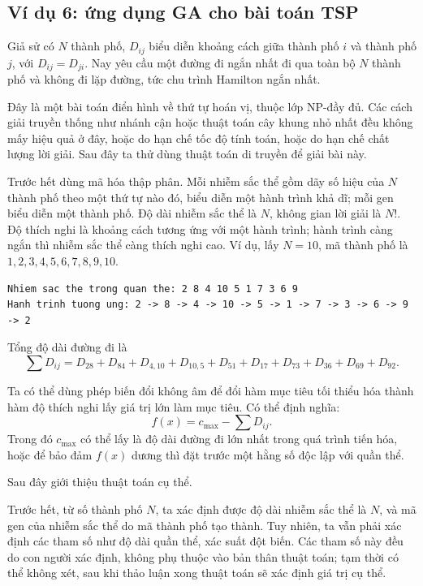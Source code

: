 \documentclass[11pt]{article}
\begin{document}
\subsection{Ví dụ 6: ứng dụng GA cho bài toán TSP}

Giả sử có \(N\) thành phố, \(D_{ij}\) biểu diễn khoảng cách giữa thành phố
\(i\) và thành phố \(j\), với \(D_{ij}=D_{ji}\). Nay yêu cầu một đường đi
ngắn nhất đi qua toàn bộ \(N\) thành phố và không đi lặp đường, tức chu trình
Hamilton ngắn nhất.

Đây là một bài toán điển hình về thứ tự hoán vị, thuộc lớp NP-đầy đủ. Các
cách giải truyền thống như nhánh cận hoặc thuật toán cây khung nhỏ nhất đều
không mấy hiệu quả ở đây, hoặc do hạn chế tốc độ tính toán, hoặc do hạn chế
chất lượng lời giải. Sau đây ta thử dùng thuật toán di truyền để giải bài
này.

Trước hết dùng mã hóa thập phân. Mỗi nhiễm sắc thể gồm dãy số hiệu của \(N\)
thành phố theo một thứ tự nào đó, biểu diễn một hành trình khả dĩ; mỗi gen
biểu diễn một thành phố. Độ dài nhiễm sắc thể là \(N\), không gian lời giải
là \(N!\). Độ thích nghi là khoảng cách tương ứng với một hành trình; hành
trình càng ngắn thì nhiễm sắc thể càng thích nghi cao. Ví dụ, lấy \(N=10\),
mã thành phố là \(1,2,3,4,5,6,7,8,9,10\).
\begin{verbatim}
Nhiem sac the trong quan the: 2 8 4 10 5 1 7 3 6 9
Hanh trinh tuong ung: 2 -> 8 -> 4 -> 10 -> 5 -> 1 -> 7 -> 3 -> 6 -> 9 -> 2
\end{verbatim}
Tổng độ dài đường đi là
\[
  \sum D_{ij}=D_{28}+D_{84}+D_{4,10}+D_{10,5}+D_{51}
  +D_{17}+D_{73}+D_{36}+D_{69}+D_{92}.
\]

Ta có thể dùng phép biến đổi không âm để đổi hàm mục tiêu tối thiểu hóa thành
hàm độ thích nghi lấy giá trị lớn làm mục tiêu. Có thể định nghĩa:
\[
  f(x)=c_{\max}-\sum D_{ij}.
\]
Trong đó \(c_{\max}\) có thể lấy là độ dài đường đi lớn nhất trong quá trình
tiến hóa, hoặc để bảo đảm \(f(x)\) dương thì đặt trước một hằng số độc lập
với quần thể.

Sau đây giới thiệu thuật toán cụ thể.

Trước hết, từ số thành phố \(N\), ta xác định được độ dài nhiễm sắc thể là
\(N\), và mã gen của nhiễm sắc thể do mã thành phố tạo thành. Tuy nhiên, ta
vẫn phải xác định các tham số như độ dài quần thể, xác suất đột biến. Các
tham số này đều do con người xác định, không phụ thuộc vào bản thân thuật
toán; tạm thời có thể không xét, sau khi thảo luận xong thuật toán sẽ xác
định giá trị cụ thể.
\end{document}
